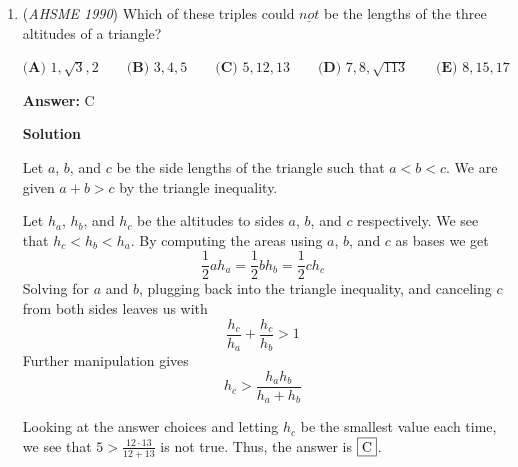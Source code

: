 \begin{enumerate}
For $i\in\{1,2,3,\ldots,10\},$ suppose Person $i$ announces the number $i.$

 Let $x$ be the number picked by Person $6.$ We construct the following table:
 \[\begin{array}{c|c|c||l} & & & \\ [-2.5ex] \textbf{People} & \textbf{Average of \#s Picked} & \textbf{Sum of \#s Picked} & \multicolumn{1}{c}{\textbf{Conclusion}} \\ [0.5ex] \hline & & & \\ [-2ex] 6\text{ and }8 & 7 & 14 & \text{Person 8 picks } 14-x. \\ 8\text{ and }10 & 9 & 18 & \text{Person 10 picks } 4+x. \\ 10\text{ and }2 & 1 & 2 & \text{Person 2 picks } -2-x \\ 2\text{ and }4 & 3 & 6 & \text{Person 4 picks } 8+x \\ 4\text{ and }6 & 5 & 10 & \text{Person 6 picks } 2-x \\ \end{array}\]We have $x=2-x,$ from which $x=\boxed{\textbf{(A) } 1}.$



	\item (\textit{AHSME 1990}) Which of these triples could $\underline{not}$ be the lengths of the three altitudes of a triangle?


 $\textbf{(A) } 1,\sqrt{3},2\qquad \textbf{(B) } 3,4,5\qquad \textbf{(C) } 5,12,13\qquad \textbf{(D) } 7,8,\sqrt{113}\qquad \textbf{(E) } 8,15,17$

 \textbf{Answer: }C



\textbf{Solution}

Let $a$, $b$, and $c$ be the side lengths of the triangle such that $a<b<c$. We are given $a+b>c$ by the triangle inequality.

 Let $h_a$, $h_b$, and $h_c$ be the altitudes to sides $a$, $b$, and $c$ respectively. We see that $h_c<h_b<h_a$. By computing the areas using $a$, $b$, and $c$ as bases we get 
 \[\frac{1}{2}ah_a=\frac{1}{2}bh_b=\frac{1}{2}ch_c\]Solving for $a$ and $b$, plugging back into the triangle inequality, and canceling $c$ from both sides leaves us with 
 \[\frac{h_c}{h_a}+\frac{h_c}{h_b}>1\]Further manipulation gives 
 \[h_c>\frac{h_ah_b}{h_a+h_b}\]

 Looking at the answer choices and letting $h_c$ be the smallest value each time, we see that $5>\frac{12\cdot13}{12+13}$ is not true. Thus, the answer is $\fbox{C}$.


\end{enumerate}
